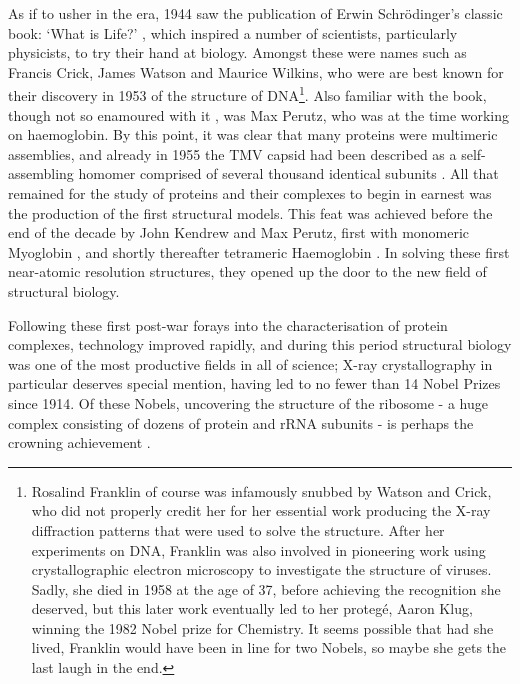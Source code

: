 \documentclass[a4paper,11pt,twoside,openright]{scrbook}
\begin{document}
As if to usher in the era, 1944 saw the publication of Erwin Schrödinger's classic book: `What is Life?' \cite{Schrodinger1947}, which inspired a number of scientists, particularly physicists, to try their hand at biology. Amongst these were names such as Francis Crick, James Watson and Maurice Wilkins, who were are best known for their discovery in 1953 of the structure of DNA\footnote{Rosalind Franklin of course was infamously snubbed by Watson and Crick, who did not properly credit her for her essential work producing the X-ray diffraction patterns that were used to solve the structure. After her experiments on DNA, Franklin was also involved in pioneering work using crystallographic electron microscopy to investigate the structure of viruses. Sadly, she died in 1958 at the age of 37, before achieving the recognition she deserved, but this later work eventually led to her proteg{\'e},  Aaron Klug, winning the 1982 Nobel prize for Chemistry. It seems possible that had she lived, Franklin would have been in line for two Nobels, so maybe she gets the last laugh in the end.}. Also familiar with the book, though not so enamoured with it \cite{Dronamraju1999}, was Max Perutz, who was at the time working on haemoglobin. By this point, it was clear that many proteins were multimeric assemblies, and already in 1955 the TMV capsid had been described as a self-assembling homomer comprised of several thousand identical subunits \cite{Fraenkel-Conrat1955}. All that remained for the study of proteins and their complexes to begin in earnest was the production of the first structural models. This feat was achieved before the end of the decade by John Kendrew and Max Perutz, first with monomeric Myoglobin \cite{Kendrew1958}, and shortly thereafter tetrameric Haemoglobin \cite{Perutz1960}. In solving these first near-atomic resolution structures, they opened up the door to the new field of structural biology.

Following these first post-war forays into the characterisation of protein complexes, technology improved rapidly, and during this period structural biology was one of the most productive fields in all of science; X-ray crystallography in particular deserves special mention, having led to no fewer than 14 Nobel Prizes since 1914. Of these Nobels, uncovering the structure of the ribosome - a huge complex consisting of dozens of protein and rRNA subunits - is perhaps the crowning achievement \cite{Schluenzen2000,Ramakrishnan2000,Ban2000}.
\end{document}
